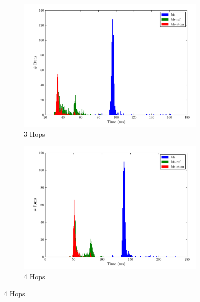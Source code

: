 				\begin{figure}
					\ContinuedFloat
					\begin{subfigure}[b]{.5\linewidth}
						\includegraphics[scale=0.45]{figures/charts/3_hops.pdf}
						\caption{3 Hops}
						\label{subfig:3-hops}
					\end{subfigure}
					\begin{subfigure}[b]{.5\linewidth}
						\includegraphics[scale=0.45]{figures/charts/4_hops.pdf}
						\caption{4 Hops}
						\label{subfig:4-hops}
					\end{subfigure}
				\end{figure}
				
